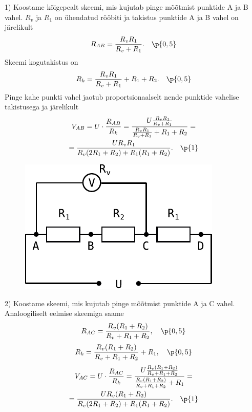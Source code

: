 1) Koostame kõigepealt skeemi, mis kujutab pinge mõõtmist punktide A ja B vahel. $R_v$ ja $R_1$ on ühendatud rööbiti ja takistus punktide A ja B vahel on järelikult
\[
R_{AB}=\frac{R_v R_1}{R_v + R_1}. \quad \p{0,5}
\]
Skeemi kogutakistus on
\[
R_{k}=\frac{R_v R_1}{R_v + R_1} + R_1+R_2. \quad \p{0,5}
\]
Pinge kahe punkti vahel jaotub proportsionaalselt nende punktide vahelise takistusega ja järelikult
\begin{multline*}
V_{AB}=U\cdot\frac{R_{AB}}{R_k}=\frac{U\frac{R_v R_1}{R_v + R_1}}{\frac{R_v R_1}{R_v + R_1} + R_1+R_2}=\\
=\frac{UR_vR_1}{R_v(2R_1+R_2)+R_1(R_1+R_2)}. \quad \p{1}
\end{multline*}

\begin{figure}
\vspace{-1em}
  \begin{center}
    \includegraphics[width=1\linewidth]{2023-v2g-07-yl2.pdf}
  \end{center}
\end{figure}

2) Koostame skeemi, mis kujutab pinge mõõtmist punktide A ja C vahel. Analoogiliselt eelmise skeemiga saame
\[
R_{AC}=\frac{R_v (R_1+R_2)}{R_v + R_1+R_2}, \quad \p{0,5}
\]
\[
R_{k}=\frac{R_v (R_1+R_2)}{R_v + R_1+R_2}+R_1, \quad \p{0,5}
\]
\begin{multline*}
V_{AC}=U\cdot\frac{R_{AC}}{R_k}=\frac{U\frac{R_v (R_1+R_2)}{R_v + R_1+R_2}}{\frac{R_v (R_1+R_2)}{R_v + R_1+R_2}+R_1}=\\
=\frac{UR_v(R_1+R_2)}{R_v(2R_1+R_2)+R_1(R_1+R_2)}. \quad \p{1}
\end{multline*}

